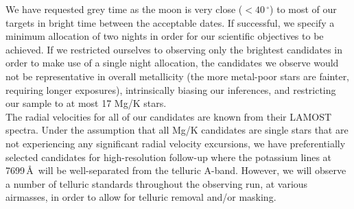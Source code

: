 \documentclass{article}
\begin{document}
\begin{technicalinfo}
We have requested grey time as the moon is very close ($<40\,^\circ$) to most of our targets in bright time between the acceptable dates. If successful,  we specify a minimum allocation of two nights in order for our scientific objectives to be achieved. If we restricted ourselves to observing only the brightest candidates in order to make use of a single night allocation, the candidates we observe would not be representative in overall metallicity (the more metal-poor stars are fainter, requiring longer exposures), intrinsically biasing our inferences, and restricting our sample to at most 17 Mg/K stars.\\


The radial velocities for all of our candidates are known from their LAMOST spectra. Under the assumption that all Mg/K candidates are single stars that are not experiencing any significant radial velocity excursions, we have preferentially selected candidates for high-resolution follow-up where the potassium lines at 7699\,\AA\ will be well-separated from the telluric A-band. However, we will observe a number of telluric standards throughout the observing run, at various airmasses, in order to allow for telluric removal and/or masking.
\end{technicalinfo}


\end{document}
